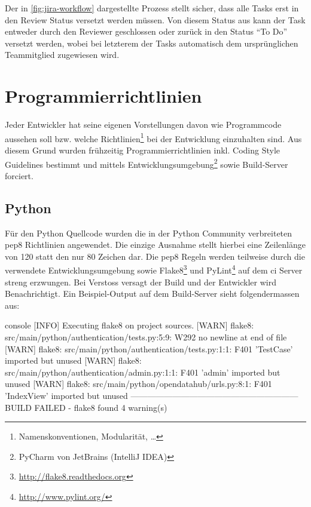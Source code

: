 Der in \cref{fig:jira-workflow} dargestellte Prozess stellt sicher, dass alle Tasks erst in den Review Status versetzt werden müssen. Von diesem Status aus kann der Task entweder durch den Reviewer geschlossen oder zurück in den Status ``To Do'' versetzt werden, wobei bei letzterem der Tasks automatisch dem ursprünglichen Teammitglied zugewiesen wird.


\section{Programmierrichtlinien}
Jeder Entwickler hat seine eigenen Vorstellungen davon wie Programmcode aussehen soll bzw. welche Richtlinien\footnote{Namenskonventionen, Modularität, \dots} bei der Entwicklung einzuhalten sind. Aus diesem Grund wurden frühzeitig Programmierrichtlinien inkl. Coding Style Guidelines bestimmt und mittels Entwicklungsumgebung\footnote{PyCharm von JetBrains (IntelliJ IDEA)} sowie Build-Server forciert.


\subsection{Python}
Für den Python Quellcode wurden die in der Python Community verbreiteten \gls{pep8} Richtlinien angewendet. Die einzige Ausnahme stellt hierbei eine Zeilenlänge von 120 statt den nur 80 Zeichen dar. Die \gls{pep8} Regeln werden teilweise durch die verwendete Entwicklungsumgebung sowie Flake8\footnote{\url{http://flake8.readthedocs.org}} und PyLint\footnote{\url{http://www.pylint.org/}} auf dem \gls{ci} Server streng erzwungen. Bei Verstoss versagt der Build und der Entwickler wird Benachrichtigt. Ein Beispiel-Output auf dem Build-Server sieht folgendermassen aus:

\begin{src}{console}
[INFO]  Executing flake8 on project sources.
[WARN]  flake8: src/main/python/authentication/tests.py:5:9: W292 no newline at end of file
[WARN]  flake8: src/main/python/authentication/tests.py:1:1: F401 'TestCase' imported but unused
[WARN]  flake8: src/main/python/authentication/admin.py:1:1: F401 'admin' imported but unused
[WARN]  flake8: src/main/python/opendatahub/urls.py:8:1: F401 'IndexView' imported but unused
------------------------------------------------------------
BUILD FAILED - flake8 found 4 warning(s)
\end{src}


